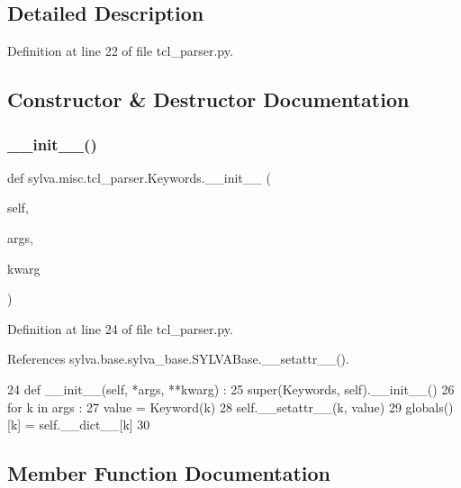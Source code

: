 \subsection{Detailed Description}


Definition at line 22 of file tcl\+\_\+parser.\+py.



\subsection{Constructor \& Destructor Documentation}
\mbox{\label{classsylva_1_1misc_1_1tcl__parser_1_1_keywords_a4b7a15b3c0639416663e46d942c9b9be}} 
\subsubsection{\texorpdfstring{\+\_\+\+\_\+init\+\_\+\+\_\+()}{\_\_init\_\_()}}
{\footnotesize\ttfamily def sylva.\+misc.\+tcl\+\_\+parser.\+Keywords.\+\_\+\+\_\+init\+\_\+\+\_\+ (\begin{DoxyParamCaption}\item[{}]{self,  }\item[{}]{args,  }\item[{}]{kwarg }\end{DoxyParamCaption})}



Definition at line 24 of file tcl\+\_\+parser.\+py.



References sylva.\+base.\+sylva\+\_\+base.\+S\+Y\+L\+V\+A\+Base.\+\_\+\+\_\+setattr\+\_\+\+\_\+().


\begin{DoxyCode}
24     \textcolor{keyword}{def }\_\_init\_\_(self, *args, **kwarg) :
25       super(Keywords, self).\_\_init\_\_()
26       \textcolor{keywordflow}{for} k \textcolor{keywordflow}{in} args :
27         value = Keyword(k)
28         self.\_\_setattr\_\_(k, value)
29         globals()[k] = self.\_\_dict\_\_[k]
30 
\end{DoxyCode}


\subsection{Member Function Documentation}
\mbox{\label{classsylva_1_1misc_1_1tcl__parser_1_1_keywords_a0a9e148d0396587905bf17d93d3cac1a}} 

